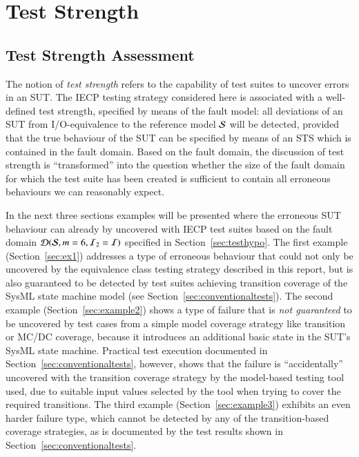  

 
\section{Test Strength}
\label{sec:test-strength}
\subsection{Test Strength Assessment}

The notion of {\it test strength} refers to the capability of test suites to uncover   errors in an SUT. The IECP testing strategy considered here is associated with a well-defined test strength, specified by means of the fault model: all deviations of an SUT from I/O-equivalence to the reference model ${\cal S}$ will be detected, provided that the true behaviour of the SUT can be specified by means of an STS which is contained in the fault domain. Based on the fault domain, the discussion of test strength is ``transformed'' into the question  whether the size of the fault domain for which the test suite has been created is sufficient to contain all erroneous behaviours we can reasonably expect.
 
 
In the next three sections examples will be presented where the erroneous SUT behaviour can already by uncovered with IECP test suites based on the fault domain ${\cal D}({\cal S},m=6,{\cal I}_2={\cal I})$ specified in Section~\ref{sec:testhypo}.   
The first example (Section~\ref{sec:ex1}) addresses a type of erroneous behaviour that could not only be uncovered by the equivalence class testing strategy described in this report, but is also 
guaranteed to be detected by test suites achieving transition coverage of the SysML state machine model (see Section~\ref{sec:conventionaltests}). The second example (Section~\ref{sec:example2}) shows a type of failure that is {\it not guaranteed} to be uncovered by test cases from a simple model coverage strategy like transition or MC/DC coverage, because it introduces an additional basic state in the SUT's SysML state machine. Practical test execution documented in Section~\ref{sec:conventionaltests}, however, shows that  the failure is ``accidentally'' uncovered 
with the transition coverage strategy by the model-based testing tool used, due to suitable input values selected by the tool when trying to cover the required transitions.
The third example (Section~\ref{sec:example3}) exhibits an even harder failure type, which cannot be detected by any of the transition-based coverage strategies, as is documented by the test results
shown in Section~\ref{sec:conventionaltests}.  

